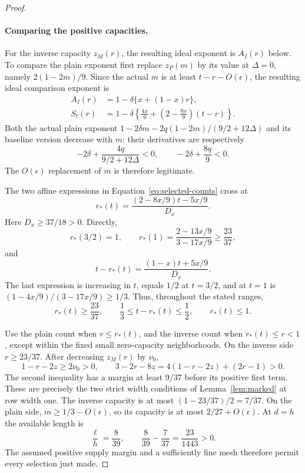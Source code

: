 \documentclass[11pt,a4paper]{article}
\numberwithin{equation}{section}
\numberwithin{figure}{section}
\theoremstyle{definition}
\theoremstyle{remark}
\begin{document}
\begin{proof}
\paragraph{Comparing the positive capacities.}
For the inverse capacity \(z_M(r)\), the resulting ideal exponent
is \(A_I(r)\) below.  To compare the plain exponent first replace
\(z_P(m)\) by its value at \(\Delta=0\), namely
\(2(1-2m)/9\).  Since the actual \(m\) is at least
\(t-r-O(\epsilon)\), the resulting ideal comparison exponent is
\begin{equation}
 \begin{aligned}
 A_I(r)&=1-\delta\{x+(1-x)r\},\\
 S_t(r)&=1-\delta\left\{\frac{4x}{9}
          +\left(2-\frac{8x}{9}\right)(t-r)\right\}.
 \end{aligned}
 \label{eq:selected-counts}
\end{equation}
Both the actual plain exponent
\(1-2\delta m-2q(1-2m)/(9/2+12\Delta)\) and its baseline
version decrease with \(m\): their derivatives are respectively
\[
 -2\delta+\frac{4q}{9/2+12\Delta}<0,\qquad
 -2\delta+\frac{8q}{9}<0.
\]
The \(O(\epsilon)\) replacement of \(m\) is therefore legitimate.

The two affine expressions in Equation~\eqref{eq:selected-counts}
cross at
\[
 r_*(t)=
 \frac{(2-8x/9)t-5x/9}{D_x}.
\]
Here \(D_x\ge37/18>0\).  Directly,
\[
 r_*(3/2)=1,\qquad
 r_*(1)=\frac{2-13x/9}{3-17x/9}\ge\frac{23}{37},
\]
and
\[
 t-r_*(t)=\frac{(1-x)t+5x/9}{D_x}.
\]
The last expression is increasing in \(t\), equals \(1/2\) at
\(t=3/2\), and at \(t=1\) is
\((1-4x/9)/(3-17x/9)\ge1/3\).
Thus, throughout the stated ranges,
\[
 r_*(t)\ge\frac{23}{37},\qquad
 \frac13\le t-r_*(t)\le\frac12,\qquad r_*(t)\le1.
\]

Use the plain count when \(r\le r_*(t)\), and the inverse count
when \(r_*(t)\le r<1\), except within the fixed small
zero-capacity neighborhoods.  On the inverse side \(r\ge23/37\).
After decreasing \(z_M(r)\) by \(\nu_0\),
\[
 1-r-2z\ge2\nu_0>0,\qquad
 3-2r-8z=4(1-r-2z)+(2r-1)>0.
\]
The second inequality has a margin at least \(9/37\) before its
positive first term.  These are precisely the two strict width
conditions of Lemma~\ref{lem:marked} at row width one.
The inverse capacity is at most
\((1-23/37)/2=7/37\).  On the plain side,
\(m\ge1/3-O(\epsilon)\), so its capacity is at most
\(2/27+O(\epsilon)\).  At \(d=h\) the available length is
\[
 \frac{\ell}{h}=\frac8{39},\qquad
 \frac8{39}-\frac7{37}=\frac{23}{1443}>0.
\]
The assumed positive supply margin and a sufficiently fine mesh
therefore permit every selection just made.


\end{proof}
\end{document}
